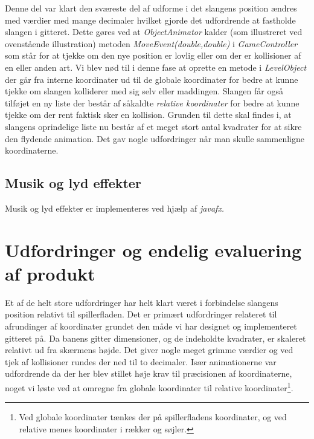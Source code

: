 \documentclass[]{article}
\begin{document}
	Denne del var klart den sværeste del af udforme i det slangens position ændres med værdier med mange decimaler hvilket gjorde det udfordrende at fastholde slangen i gitteret. Dette gøres ved at \textit{ObjectAnimator} kalder (som illustreret ved ovenstående illustration) metoden \textit{MoveEvent(double,double)} i \textit{GameController} som står for at tjekke om den nye position er lovlig eller om der er kollisioner af en eller anden art. Vi blev nød til i denne fase at oprette en metode i \textit{LevelObject} der går fra interne koordinater ud til de globale koordinater for bedre at kunne tjekke om slangen kolliderer med sig selv eller maddingen. Slangen får også tilføjet en ny liste der består af såkaldte \textit{relative koordinater} for bedre at kunne tjekke om der rent faktisk sker en kollision. Grunden til dette skal findes i, at slangens oprindelige liste nu består af et meget stort antal kvadrater for at sikre den flydende animation. Det gav nogle udfordringer når man skulle sammenligne koordinaterne.\\
	
	\subsection{Musik og lyd effekter}
	
	Musik og lyd effekter er implementeres ved hjælp af \textit{javafx.}

\section{Udfordringer og endelig evaluering af produkt}

Et af de helt store udfordringer har helt klart været i forbindelse slangens position relativt til spillerfladen. Det er primært udfordringer relateret til afrundinger af koordinater grundet den måde vi har designet og implementeret gitteret på. Da banens gitter dimensioner, og de indeholdte kvadrater, er skaleret relativt ud fra skærmens højde. Det giver nogle meget grimme værdier og ved tjek af kollisioner rundes der ned til to decimaler. Især animationerne var udfordrende da der her blev stillet høje krav til præcisionen af koordinaterne, noget vi løste ved at omregne fra globale koordinater til relative koordinater\footnote{Ved globale koordinater tænkes der på spillerfladens koordinater, og ved relative menes koordinater i rækker og søjler.}.
\end{document}
